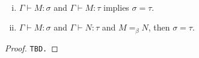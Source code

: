 \begin{proposition} {\ }
    \begin{enumerate}[(i)]
        \item $\Gamma \vdash M:\sigma$ and $\Gamma \vdash M:\tau$ implies
            $\sigma = \tau$.
        \item $\Gamma \vdash M:\sigma$ and $\Gamma \vdash N:\tau$ and $M =_\beta
            N$, then $\sigma = \tau$.
    \end{enumerate}
\end{proposition}
\begin{proof}
    \texttt{TBD.}
\end{proof}

